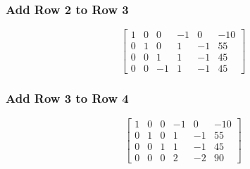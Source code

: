 \documentclass[12pt,a4paper]{article}
\begin{document}
\begin{solution}
\subsubsection*{Add Row 2 to Row 3}
\[
\left[ \begin{array}{ccccc|c}
1 & 0 & 0 & -1 & 0 & -10 \\
0 & 1 & 0 & 1 & -1 & 55 \\
0 & 0 & 1 & 1 & -1 & 45 \\
0 & 0 & -1 & 1 & -1 & 45 
\end{array} \right]
\]

\subsubsection*{Add Row 3 to Row 4}
\[
\left[ \begin{array}{ccccc|c}
1 & 0 & 0 & -1 & 0 & -10 \\
0 & 1 & 0 & 1 & -1 & 55 \\
0 & 0 & 1 & 1 & -1 & 45 \\
0 & 0 & 0 & 2 & -2 & 90 
\end{array} \right]
\]


\end{solution}
\end{document}
